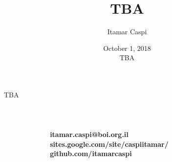 \documentclass[aspectratio=169]{beamer}
\title{\textsc{TBA}}
\date{October 1, 2018 \\ \vspace{1cm} TBA}
\author{Itamar Caspi}
\institute{Bank of Israel}
\begin{document}
\maketitle


\begin{frame}{TBA}
\end{frame}


{
\begin{frame}
\vspace{1.5cm}
    \begin{center}
{
{\YUGE \faComments}\\
}
\end{center}
\vspace{1cm}
\begin{columns}
\begin{column}{0.36\textwidth}
\end{column}
\begin{column}{0.45\textwidth}
{
{\small 
\href{itamar.caspi@boi.org.il}{\faEnvelope} \textbf{itamar.caspi@boi.org.il}\\
\vspace{0.1cm}
\href{https://www.itamarcaspi.net}{\faHome} \textbf{sites.google.com/site/caspiitamar/}\\
\href{https://github.com/itamarcaspi}{\faGithub} \textbf{github.com/itamarcaspi}}
}
\end{column}
\begin{column}{0.2\textwidth}
\end{column}
\end{columns}
\end{frame}
}


\appendix
\end{document}
